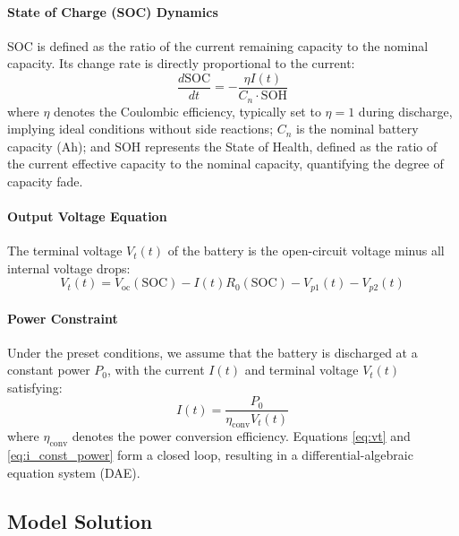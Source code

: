 \paragraph{State of Charge (SOC) Dynamics}
SOC is defined as the ratio of the current remaining capacity to the nominal capacity. 
Its change rate is directly proportional to the current:
\begin{equation}
\frac{d\text{SOC}}{dt} = -\frac{\eta I(t)}{C_n \cdot \text{SOH}}
\label{eq:dsoc}
\end{equation}
where $\eta$ denotes the Coulombic efficiency, typically set to $\eta=1$ during discharge, implying ideal conditions 
without side reactions; $C_n$ is the nominal battery capacity (Ah); and $\text{SOH}$ represents the State of Health, 
defined as the ratio of the current effective capacity to the nominal capacity, quantifying the degree of capacity fade.

\paragraph{Output Voltage Equation}
The terminal voltage $V_t(t)$ of the battery is the open-circuit voltage minus all internal voltage drops:
\begin{equation}
V_t(t) = V_{\text{oc}}(\text{SOC}) - I(t)R_0(\text{SOC}) - V_{p1}(t) - V_{p2}(t)
\label{eq:vt}
\end{equation}

\paragraph{Power Constraint}
Under the preset conditions, we assume that the battery is discharged at a constant power $P_0$, 
with the current $I(t)$ and terminal voltage $V_t(t)$ satisfying:
\begin{equation}
I(t) = \frac{P_0}{\eta_{\text{conv}} V_t(t)}
\label{eq:i_const_power}
\end{equation}
where $\eta_{\text{conv}}$ denotes the power conversion efficiency. 
Equations \eqref{eq:vt} and \eqref{eq:i_const_power} form a closed loop, 
resulting in a differential-algebraic equation system (DAE).

\subsection{Model Solution}

